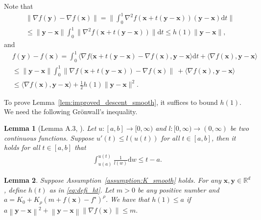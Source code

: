 \documentclass{article}
\newtheorem{lemma}{Lemma}
\newcommand{\Norm}[1]{\left\|#1\right\|}
\newcommand{\Kr}{K_{\rho}}
\newcommand{\paren}[1]{\left( #1 \right)}
\newcommand{\bx}{\mathbf{x}}
\newcommand{\by}{\mathbf{y}}
\begin{document}
Note that 
\begin{equation}\nonumber
    \begin{aligned}
        &\|\nabla f(\by)-\nabla f(\bx)\|=\|\int_0^1 \nabla^2 f\left(\bx+t(\by-\bx)\right)(\by-\bx)\mathrm{d}t\|\\
        &\leq \|\by-\bx\|\int_0^1\|\nabla^2 f\left(\bx+t(\by-\bx)\right)\|\mathrm{d}t
        \leq h(1)\|\by-\bx\|,
    \end{aligned}
\end{equation}
and 
\begin{equation}\label{eq:descent_h1}
    \begin{aligned}
        &f(\by)-f(\bx)=\int_0^1 \langle \nabla f(\bx+t(\by-\bx)-\nabla f(\bx), \by-\bx\rangle\mathrm{d}t + \langle\nabla f(\bx),\by-\bx \rangle\\
        &\leq \|\by-\bx\|\int_0^1\|\nabla f(\bx+t(\by-\bx))-\nabla f(\bx)\|\
        +\langle\nabla f(\bx),\by-\bx \rangle\\
        &\leq \langle\nabla f(\bx),\by-\bx \rangle + \frac{1}{2}h(1)\|\by-\bx\|^2.
    \end{aligned}
\end{equation}

To prove Lemma~\ref{lem:improved_descent_smooth}, it suffices to bound $h(1)$. We need the following Grönwall's inequality.

\begin{lemma}[Lemma A.3,
\cite{li2023convex}]\label{lem:gronwall}
     Let $u:[a,b] \to [0,\infty)$ and $l:[0,\infty) \to (0,\infty)$ be two continuous functions. Suppose $u'(t) \le l(u(t))$ for all $t \in [a,b]$, then it holds for all $t \in [a,b]$ that
    \begin{align}\nonumber
        \int_{u(a)}^{u(t)} \frac{1}{l(w)} \mathrm{d} w \le t - a.
    \end{align}
\end{lemma}

\begin{lemma}\label{lem:K_smooth_defi2}
    Suppose Assumption~\ref{assumption:K_smooth} holds. For any $\bx,\by\in\mathbb{R}^d$, define $h(t)$ as in \eqref{eq:defi_ht}.
    Let $m>0$ be any positive number and 
    $a=K_0+\Kr\paren{m+f(\bx)-f^\star}^\rho$.
    We have that $h(1)\leq a$ if
    $a\Norm{\by-\bx}^2+\Norm{\by-\bx}\Norm{\nabla f(\bx)}\leq m.$
\end{lemma}
\end{document}
